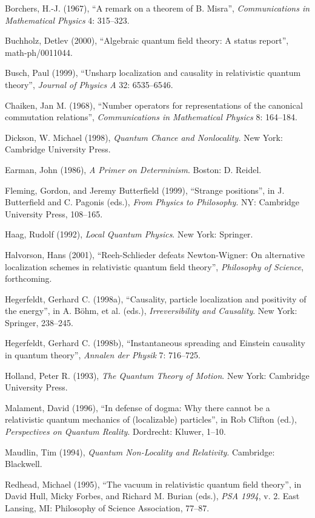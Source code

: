 \documentclass[12pt]{article}
\theoremstyle{remark}
\begin{document}
Borchers, H.-J. (1967), ``A remark on a theorem of B.  Misra'', {\it
  Communications in Mathematical Physics} 4: 315--323.

Buchholz, Detlev (2000), ``Algebraic quantum field theory: A status
report'', math-ph/0011044.
  
Busch, Paul (1999), ``Unsharp localization and causality in
relativistic quantum theory'', {\it Journal of Physics A} 32:
6535--6546.

Chaiken, Jan M. (1968), ``Number operators for representations of the
canonical commutation relations'', {\it Communications in Mathematical
  Physics} 8: 164--184.

Dickson, W. Michael (1998), {\it Quantum Chance and Nonlocality.} New
York: Cambridge University Press.

Earman, John (1986), {\it A Primer on Determinism}. Boston: D.
Reidel.

Fleming, Gordon, and Jeremy Butterfield (1999), ``Strange positions'',
in J. Butterfield and C. Pagonis (eds.), {\it From Physics to
  Philosophy}. NY: Cambridge University Press, 108--165.

Haag, Rudolf (1992), {\it Local Quantum Physics}. New York: Springer.

Halvorson, Hans (2001), ``Reeh-Schlieder defeats Newton-Wigner: On
alternative localization schemes in relativistic quantum field
theory'', {\it Philosophy of Science}, forthcoming.

Hegerfeldt, Gerhard C. (1998a), ``Causality, particle localization and
positivity of the energy'', in A.  B{\"o}hm, et al. (eds.), {\it
  Irreversibility and Causality}. New York: Springer, 238--245.

Hegerfeldt, Gerhard C. (1998b), ``Instantaneous spreading and Einstein
causality in quantum theory'', {\it Annalen der Physik} 7: 716--725.

Holland, Peter R. (1993), {\it The Quantum Theory of Motion}. New
York: Cambridge University Press.

Malament, David (1996), ``In defense of dogma: Why there cannot be a
relativistic quantum mechanics of (localizable) particles'', in Rob
Clifton (ed.), {\it Perspectives on Quantum Reality}. Dordrecht:
Kluwer, 1--10.

Maudlin, Tim (1994), {\it Quantum Non-Locality and Relativity}.
Cambridge: Blackwell.

Redhead, Michael (1995), ``The vacuum in relativistic quantum field
theory'', in David Hull, Micky Forbes, and Richard M. Burian (eds.),
{\it PSA 1994}, v. 2. East Lansing, MI: Philosophy of Science
Association, 77--87.
\end{document}
